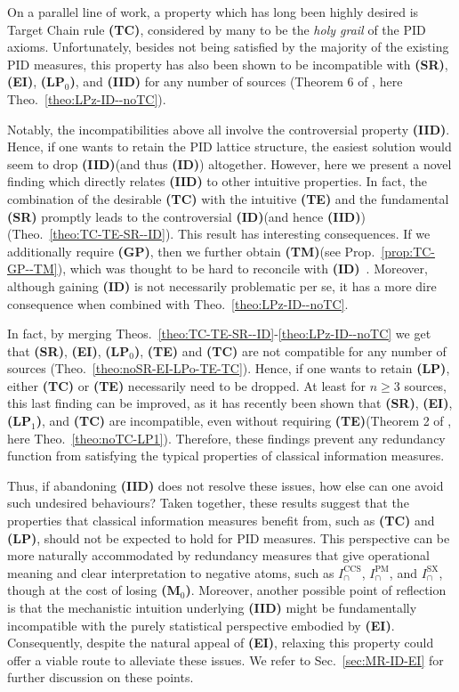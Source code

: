 \documentclass{article}
\newcommand{\ts}[1]{\ensuremath{_{\text{#1}}}}
\newcommand{\SR}{\textbf{(SR)}\xspace} %
\newcommand{\Mz}{\textbf{(M\ts{0})}\xspace} %
\newcommand{\GP}{\textbf{(GP)}\xspace} %
\newcommand{\LPz}{\textbf{(LP\ts{0})}\xspace} %
\newcommand{\ID}{\textbf{(ID)}\xspace} %
\newcommand{\IID}{\textbf{(IID)}\xspace} %
\newcommand{\TM}{\textbf{(TM)}\xspace} %
\newcommand{\TC}{\textbf{(TC)}\xspace} %
\newcommand{\LPo}{\textbf{(LP\ts{1})}\xspace} %
\newcommand{\TE}{\textbf{(TE)}\xspace} %
\newcommand{\EI}{\textbf{(EI)}\xspace} %
\newcommand{\LP}{\textbf{(LP)}\xspace}
\newcommand{\IPM}{\ensuremath{I_\cap^{\text{PM}}}\xspace}
\newcommand{\ICCS}{\ensuremath{I_\cap^{\text{CCS}}}\xspace}
\newcommand{\ISX}{\ensuremath{I_\cap^{\text{SX}}}\xspace}
\begin{document}
On a parallel line of work, a property which has long been highly desired is Target Chain rule \TC, considered by many to be the \textit{holy grail} of the PID axioms. Unfortunately, besides not being satisfied by the majority of the existing PID measures, this property has also been shown to be incompatible with \SR, \EI, \LPz, and \IID for any number of sources (Theorem 6 of \cite{finn2018pointwise}, here Theo.~\ref{theo:LPz-ID--noTC}).

Notably, the incompatibilities above all involve the controversial property \IID.
Hence, if one wants to retain the PID lattice structure, the easiest solution would seem to drop \IID (and thus \ID) altogether. 
However, here we present a novel finding which directly relates \IID to other intuitive properties.
In fact, the combination of the desirable \TC with the intuitive \TE and the fundamental \SR promptly leads to the controversial \ID (and hence \IID) (Theo.~\ref{theo:TC-TE-SR--ID}).
This result has interesting consequences. If we additionally require \GP, then we further obtain \TM (see Prop.~\ref{prop:TC-GP--TM}), which was thought to be hard to reconcile with \ID~\cite{rauh2014reconsidering}.
Moreover, although gaining \ID is not necessarily problematic per se, it has a more dire consequence when combined with Theo.~\ref{theo:LPz-ID--noTC}.

In fact, by merging Theos.~\ref{theo:TC-TE-SR--ID}-\ref{theo:LPz-ID--noTC} we get that \SR, \EI, \LPz, \TE and \TC are not compatible for any number of sources (Theo.~\ref{theo:noSR-EI-LPo-TE-TC}). Hence, if one wants to retain \LP, either \TC or \TE necessarily need to be dropped.
At least for $n\ge3$ sources, this last finding can be improved, as it has recently been shown that \SR, \EI, \LPo, and \TC are incompatible, even without requiring \TE (Theorem 2 of \cite{matthias2025novel}, here Theo.~\ref{theo:noTC-LP1}). 
Therefore, these findings prevent any redundancy function from satisfying the typical properties of classical information measures. 

Thus, if abandoning \IID does not resolve these issues, how else can one avoid such undesired behaviours?
Taken together, these results suggest that the properties that classical information measures benefit from, such as \TC and \LP, should not be expected to hold for PID measures. This perspective can be more naturally accommodated by redundancy measures that give operational meaning and clear interpretation to negative atoms, such as \ICCS, \IPM, and \ISX, though at the cost of losing \Mz. 
Moreover, another possible point of reflection is that the mechanistic intuition underlying \IID might be fundamentally incompatible with the purely statistical perspective embodied by \EI. Consequently, despite the natural appeal of \EI, relaxing this property could offer a viable route to alleviate these issues. 
We refer to Sec.~\ref{sec:MR-ID-EI} for further discussion on these points.
\end{document}
